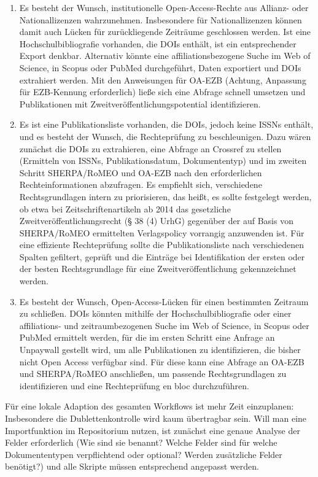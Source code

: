 \documentclass[a4paper,
fontsize=11pt,
oneside,
numbers=noperiodatend,
parskip=half-,
bibliography=totoc,
final
]{scrartcl}
\begin{document}
\begin{enumerate}
\def\labelenumi{(\alph{enumi})}
\item
  Es besteht der Wunsch, institutionelle Open-Access-Rechte aus Allianz-
  oder Nationallizenzen wahrzunehmen. Insbesondere für Nationallizenzen
  können damit auch Lücken für zurückliegende Zeiträume geschlossen
  werden. Ist eine Hochschulbibliografie vorhanden, die DOIs enthält,
  ist ein entsprechender Export denkbar. Alternativ könnte eine
  affiliationsbezogene Suche im Web of Science, in Scopus oder PubMed
  durchgeführt, Daten exportiert und DOIs extrahiert werden. Mit den
  Anweisungen für OA-EZB (Achtung, Anpassung für EZB-Kennung
  erforderlich) ließe sich eine Abfrage schnell umsetzen und
  Publikationen mit Zweitveröffentlichungspotential identifizieren.
\item
  Es ist eine Publikationsliste vorhanden, die DOIs, jedoch keine ISSNs
  enthält, und es besteht der Wunsch, die Rechteprüfung zu
  beschleunigen. Dazu wären zunächst die DOIs zu extrahieren, eine
  Abfrage an Crossref zu stellen (Ermitteln von ISSNs,
  Publikationsdatum, Dokumententyp) und im zweiten Schritt SHERPA/RoMEO
  und OA-EZB nach den erforderlichen Rechteinformationen abzufragen. Es
  empfiehlt sich, verschiedene Rechtsgrundlagen intern zu priorisieren,
  das heißt, es sollte festgelegt werden, ob etwa bei
  Zeitschriftenartikeln ab 2014 das gesetzliche
  Zweitveröffentlichungsrecht (§ 38 (4) UrhG) gegenüber der auf Basis
  von SHERPA/RoMEO ermittelten Verlagspolicy vorrangig anzuwenden ist.
  Für eine effiziente Rechteprüfung sollte die Publikationsliste nach
  verschiedenen Spalten gefiltert, geprüft und die Einträge bei
  Identifikation der ersten oder der besten Rechtsgrundlage für eine
  Zweitveröffentlichung gekennzeichnet werden.
\item
  Es besteht der Wunsch, Open-Access-Lücken für einen bestimmten
  Zeitraum zu schließen. DOIs könnten mithilfe der Hochschulbibliografie
  oder einer affiliations- und zeitraumbezogenen Suche im Web of
  Science, in Scopus oder PubMed ermittelt werden, für die im ersten
  Schritt eine Anfrage an Unpaywall gestellt wird, um alle Publikationen
  zu identifizieren, die bisher nicht Open Access verfügbar sind. Für
  diese kann eine Abfrage an OA-EZB und SHERPA/RoMEO anschließen, um
  passende Rechtsgrundlagen zu identifizieren und eine Rechteprüfung en
  bloc durchzuführen.
\end{enumerate}

Für eine lokale Adaption des gesamten Workflows ist mehr Zeit
einzuplanen: Insbesondere die Dublettenkontrolle wird kaum übertragbar
sein. Will man eine Importfunktion im Repositorium nutzen, ist zunächst
eine genaue Analyse der Felder erforderlich (Wie sind sie benannt?
Welche Felder sind für welche Dokumententypen verpflichtend oder
optional? Werden zusätzliche Felder benötigt?) und alle Skripte müssen
entsprechend angepasst werden.
\end{document}
